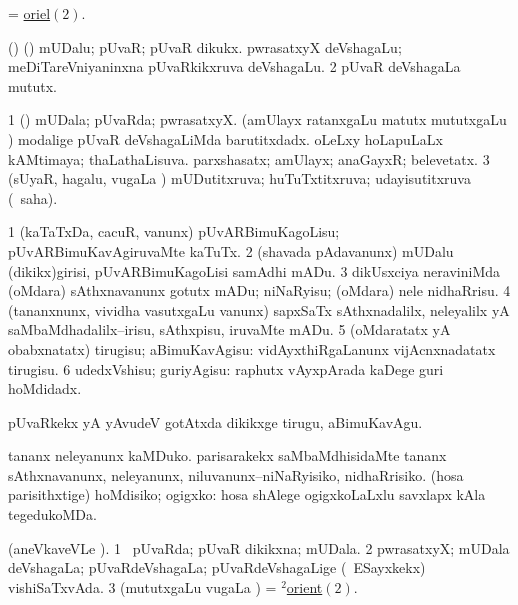 \noindent
\gl{\pagu}
\bmng
{} = \hyperlink{oriel(2)}{oriel\((2)\)}. 
\emng
\eentry

\bentry
{}
\gl{\nA}
\bmng
\bnum
{} () 
\banum
{} (\kAparx) mUDalu; pUvaR; pUvaR dikukx. 
 pwrasatxyX deVshagaLu; meDiTareVniyaninxna pUvaRkikxruva deVshagaLu. 
\eanum
\numie
\num{2} pUvaR deVshagaLa mututx. 
\enum
\emng
\eentry

\bentry
{}
\gl{\gu}
\bmng
\bnum
\num{1} (\kAparx) mUDala; pUvaRda; pwrasatxyX. 
\hypertarget{orient(2)2}{} 
 (amUlayx ratanxgaLu matutx mututxgaLu \vi) 
\banum
{} modalige pUvaR deVshagaLiMda barutitxdadx. 
 oLeLxy hoLapuLaLx kAMtimaya; thaLathaLisuva. 
 parxshasatx; amUlayx; anaGayxR; belevetatx. 
\eanum
\numie
\num{3} (sUyaR, hagalu, \mo vugaLa \vi) mUDutitxruva; huTuTxtitxruva; udayisutitxruva (\rUpa\ saha). 
\enum
\emng
\eentry

\bentry
{}
\gl{\sakirx}
\bmng
\bnum
\num{1} (kaTaTxDa, cacuR, \mo vanunx) pUvARBimuKagoLisu; pUvARBimuKavAgiruvaMte kaTuTx. 
\num{2} (shavada pAdavanunx) mUDalu (dikikx)girisi, pUvARBimuKagoLisi samAdhi mADu. 
\num{3} dikUsxciya neraviniMda (oMdara) sAthxnavanunx gotutx mADu; niNaRyisu; (oMdara) nele nidhaRrisu. 
\num{4} (tananxnunx, vividha vasutxgaLu \mo vanunx) sapxSaTx sAthxnadalilx, neleyalilx yA saMbaMdhadalilx--irisu, sAthxpisu, iruvaMte mADu. 
\num{5} (oMdaratatx yA obabxnatatx) tirugisu; aBimuKavAgisu:  vidAyxthiRgaLanunx vijAcnxnadatatx tirugisu. 
\num{6} udedxVshisu; guriyAgisu:  raphutx vAyxpArada kaDege guri hoMdidadx. 
\enum
\emng

\noindent
\gl{\akirx}
\bmng
pUvaRkekx yA yAvudeV gotAtxda dikikxge tirugu, aBimuKavAgu. 
\emng

\noindent
\gl{\pagu}
\bmng
{} 
\banum
{} tananx neleyanunx kaMDuko. 
 parisarakekx saMbaMdhisidaMte tananx sAthxnavanunx, neleyanunx, niluvanunx--niNaRyisiko, nidhaRrisiko. 
 (hosa parisithxtige) hoMdisiko; ogigxko:  hosa shAlege ogigxkoLaLxlu savxlapx kAla tegedukoMDa. 
\eanum
\emng
\eentry

\bentry
{}
\gl{\gu}
\bmng
(aneVkaveVLe ). 
\bnum
\num{1} \pArxparx\ pUvaRda; pUvaR dikikxna; mUDala. 
\num{2} pwrasatxyX; mUDala deVshagaLa; pUvaRdeVshagaLa; pUvaRdeVshagaLige (\kanmu\ ESayxkekx) vishiSaTxvAda. 
\num{3} (mututxgaLu \mo vugaLa \vi) = \hyperlink{orient(2)2}{$^2$orient\((2)\)}. 
\enum
\emng

